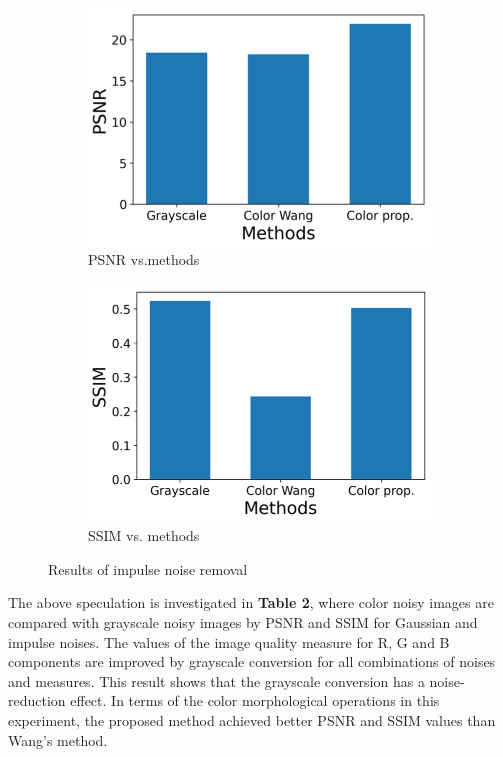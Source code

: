 \begin{figure}[H]
    \centering
    \begin{subfigure}[t]{.4\textwidth}
    \includegraphics[width=0.9\linewidth]{images/result/PSNR_impulse.png}
    \centering
    \caption{PSNR vs.methods}
    \end{subfigure}
    \begin{subfigure}[t]{.4\textwidth}
    \includegraphics[width=0.9\linewidth]{images/result/SSIM_impulse.png}
    \centering
    \caption{SSIM vs. methods}
    \end{subfigure}
    \caption{Results of impulse noise removal}
\end{figure}

The above speculation is investigated in \textbf{Table 2}, where color noisy images are compared with grayscale noisy images by PSNR and SSIM for Gaussian and impulse noises. The values of the image quality measure for R, G and B components are improved by grayscale conversion for all combinations of noises and measures. This result shows that the grayscale conversion has a noise-reduction effect. In terms of the color morphological operations in this experiment, the proposed method achieved better PSNR and SSIM values than Wang’s method.

